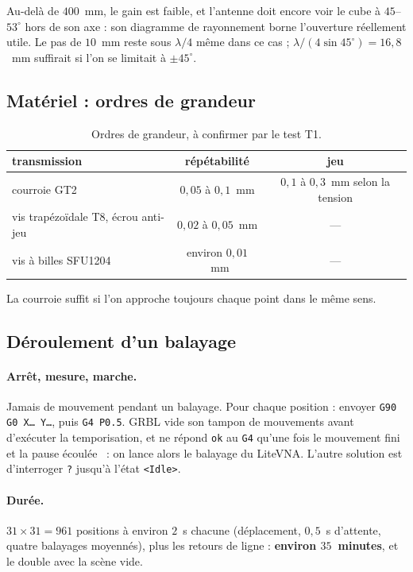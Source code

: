 \documentclass[11pt,a4paper]{article}
\begin{document}
Au-delà de $400$~mm, le gain est faible, et l'antenne doit encore voir le cube à
$45$--$53^\circ$ hors de son axe : son diagramme de rayonnement borne l'ouverture
réellement utile. Le pas de $10$~mm reste sous $\lambda/4$ même dans ce cas ;
$\lambda/(4\sin 45^\circ) = 16{,}8$~mm suffirait si l'on se limitait à
$\pm 45^\circ$.

\subsection{Matériel : ordres de grandeur}

\begin{table}[H]
\centering
\begin{tabular}{lcc}
\toprule
transmission & répétabilité & jeu \\
\midrule
courroie GT2 & $0{,}05$ à $0{,}1$~mm & $0{,}1$ à $0{,}3$~mm selon la tension \\
vis trapézoïdale T8, écrou anti-jeu & $0{,}02$ à $0{,}05$~mm & --- \\
vis à billes SFU1204 & environ $0{,}01$~mm & --- \\
\bottomrule
\end{tabular}
\caption{Ordres de grandeur, à confirmer par le test T1.}
\label{tab:materiel}
\end{table}

La courroie suffit si l'on approche toujours chaque point dans le même sens.

\subsection{Déroulement d'un balayage}

\paragraph{Arrêt, mesure, marche.}
Jamais de mouvement pendant un balayage. Pour chaque position : envoyer
\texttt{G90 G0 X\ldots{} Y\ldots}, puis \texttt{G4 P0.5}. GRBL vide son tampon de
mouvements avant d'exécuter la temporisation, et ne répond \texttt{ok} au
\texttt{G4} qu'une fois le mouvement fini et la pause écoulée~\cite{grbl} : on
lance alors le balayage du LiteVNA. L'autre solution est d'interroger
\texttt{?} jusqu'à l'état \texttt{<Idle>}.

\paragraph{Durée.}
$31 \times 31 = 961$ positions à environ $2$~s chacune (déplacement, $0{,}5$~s
d'attente, quatre balayages moyennés), plus les retours de ligne : \textbf{environ
$35$~minutes}, et le double avec la scène vide.
\end{document}
